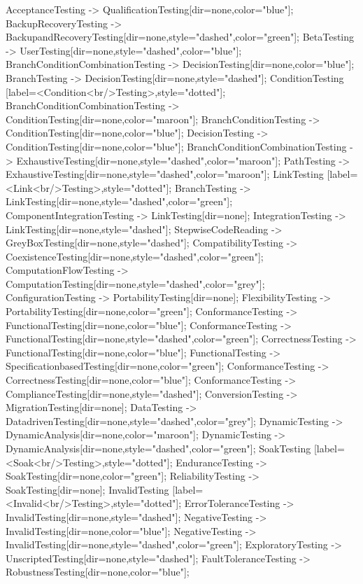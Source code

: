 \documentclass{article}
\begin{document}
{AcceptanceTesting -> QualificationTesting[dir=none,color="blue"];
BackupRecoveryTesting -> BackupandRecoveryTesting[dir=none,style="dashed",color="green"];
BetaTesting -> UserTesting[dir=none,style="dashed",color="blue"];
BranchConditionCombinationTesting -> DecisionTesting[dir=none,color="blue"];
BranchTesting -> DecisionTesting[dir=none,style="dashed"];
ConditionTesting [label=<Condition<br/>Testing>,style="dotted"];
BranchConditionCombinationTesting -> ConditionTesting[dir=none,color="maroon"];
BranchConditionTesting -> ConditionTesting[dir=none,color="blue"];
DecisionTesting -> ConditionTesting[dir=none,color="blue"];
BranchConditionCombinationTesting -> ExhaustiveTesting[dir=none,style="dashed",color="maroon"];
PathTesting -> ExhaustiveTesting[dir=none,style="dashed",color="maroon"];
LinkTesting [label=<Link<br/>Testing>,style="dotted"];
BranchTesting -> LinkTesting[dir=none,style="dashed",color="green"];
ComponentIntegrationTesting -> LinkTesting[dir=none];
IntegrationTesting -> LinkTesting[dir=none,style="dashed"];
StepwiseCodeReading -> GreyBoxTesting[dir=none,style="dashed"];
CompatibilityTesting -> CoexistenceTesting[dir=none,style="dashed",color="green"];
ComputationFlowTesting -> ComputationTesting[dir=none,style="dashed",color="grey"];
ConfigurationTesting -> PortabilityTesting[dir=none];
FlexibilityTesting -> PortabilityTesting[dir=none,color="green"];
ConformanceTesting -> FunctionalTesting[dir=none,color="blue"];
ConformanceTesting -> FunctionalTesting[dir=none,style="dashed",color="green"];
CorrectnessTesting -> FunctionalTesting[dir=none,color="blue"];
FunctionalTesting -> SpecificationbasedTesting[dir=none,color="green"];
ConformanceTesting -> CorrectnessTesting[dir=none,color="blue"];
ConformanceTesting -> ComplianceTesting[dir=none,style="dashed"];
ConversionTesting -> MigrationTesting[dir=none];
DataTesting -> DatadrivenTesting[dir=none,style="dashed",color="grey"];
DynamicTesting -> DynamicAnalysis[dir=none,color="maroon"];
DynamicTesting -> DynamicAnalysis[dir=none,style="dashed",color="green"];
SoakTesting [label=<Soak<br/>Testing>,style="dotted"];
EnduranceTesting -> SoakTesting[dir=none,color="green"];
ReliabilityTesting -> SoakTesting[dir=none];
InvalidTesting [label=<Invalid<br/>Testing>,style="dotted"];
ErrorToleranceTesting -> InvalidTesting[dir=none,style="dashed"];
NegativeTesting -> InvalidTesting[dir=none,color="blue"];
NegativeTesting -> InvalidTesting[dir=none,style="dashed",color="green"];
ExploratoryTesting -> UnscriptedTesting[dir=none,style="dashed"];
FaultToleranceTesting -> RobustnessTesting[dir=none,color="blue"];
}
\end{document}

